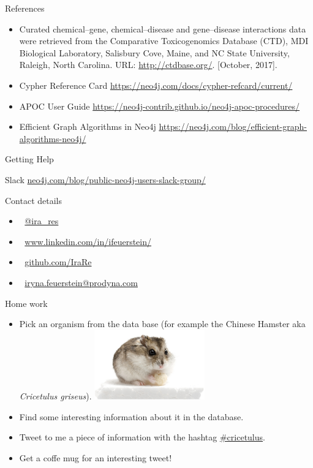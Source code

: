 \documentclass[12pt]{beamer}
\begin{document}
    \begin{frame}{References}
        \begin{itemize}
            \item Curated chemical–gene, chemical–disease and gene–disease interactions data were retrieved from the Comparative Toxicogenomics Database (CTD), MDI Biological Laboratory, Salisbury Cove, Maine, and NC State University, Raleigh, North Carolina. URL: \textcolor{white}{\url{http://ctdbase.org/}}. [October, 2017].
            \item Cypher Reference Card \textcolor{white}{\url{https://neo4j.com/docs/cypher-refcard/current/}}
            \item APOC User Guide \textcolor{white}{\url{https://neo4j-contrib.github.io/neo4j-apoc-procedures/}}
            \item Efficient Graph Algorithms in Neo4j \textcolor{white}{\url{https://neo4j.com/blog/efficient-graph-algorithms-neo4j/}}
        \end{itemize}
    \end{frame}
    
    \begin{frame}{Getting Help}
        \begin{block}{Slack}
            \url{neo4j.com/blog/public-neo4j-users-slack-group/}
        \end{block}
        \pause
        \begin{block}{Contact details}
            \begin{itemize}
                \item \faTwitter \(\;\) \url{@ira_res}
                \item \faLinkedin \(\;\) \url{www.linkedin.com/in/ifeuerstein/}
                \item \faGithub \(\;\) \url{github.com/IraRe}
                \item \Email \(\;\) \url{iryna.feuerstein@prodyna.com}
            \end{itemize}
        \end{block}
    \end{frame}
    
    \begin{frame}{Home work}
        \begin{itemize}
            \item Pick an organism from the data base (for example the Chinese Hamster aka \emph{Cricetulus griseus}).
            \includegraphics[height=3cm]{cricetulus2.png}
            \item Find some interesting information about it in the database.
            \item Tweet to me a piece of information with the hashtag \url{\#cricetulus}.
            \item Get a coffe mug for an interesting tweet!
        \end{itemize}
    \end{frame}
    
\end{document}
